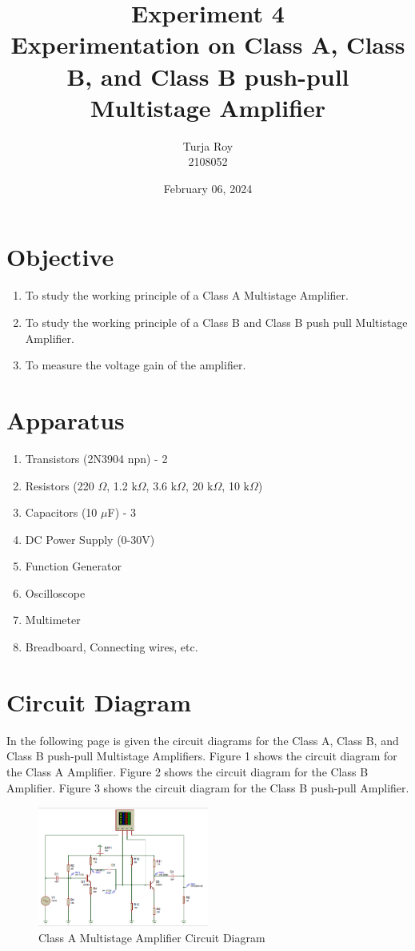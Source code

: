 \documentclass[12pt]{article}
\title{
    \textbf{\Large Experiment 4}\\
    \textbf{\Large Experimentation on Class A, Class B, and Class B push-pull Multistage Amplifier}
}
\author{
    Turja Roy\\
    2108052
}
\date{February 06, 2024}
\begin{document}
\maketitle

\section{Objective}
\begin{enumerate}
    \item To study the working principle of a Class A Multistage Amplifier.
    \item To study the working principle of a Class B and Class B push pull Multistage Amplifier.
    \item To measure the voltage gain of the amplifier.
\end{enumerate}

\section{Apparatus}
\begin{enumerate}
    \item Transistors (2N3904 npn) - 2
    \item Resistors (220 $\Omega$, 1.2 k$\Omega$, 3.6 k$\Omega$, 20 k$\Omega$, 10 k$\Omega$)
    \item Capacitors (10 $\mu$F) - 3
    \item DC Power Supply (0-30V)
    \item Function Generator
    \item Oscilloscope
    \item Multimeter
    \item Breadboard, Connecting wires, etc.
\end{enumerate}

\section{Circuit Diagram}
In the following page is given the circuit diagrams for the Class A, Class B, and Class B push-pull Multistage Amplifiers. Figure 1 shows the circuit diagram for the Class A Amplifier. Figure 2 shows the circuit diagram for the Class B Amplifier. Figure 3 shows the circuit diagram for the Class B push-pull Amplifier.

\newpage
\begin{figure}[!htpb]
    \centering
    \includegraphics[width=0.5\textwidth]{Class_A_Diagram.png}
    \caption{Class A Multistage Amplifier Circuit Diagram}
\end{figure}
\end{document}
